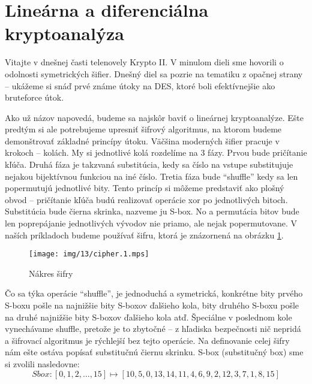 \section{Lineárna a diferenciálna kryptoanalýza}

Vitajte v dnešnej časti telenovely Krypto II. V minulom dieli sme
hovorili o odolnosti symetrických šifier. Dnešný diel sa pozrie na
tematiku z opačnej strany -- ukážeme si snáď prvé známe útoky na DES,
ktoré boli efektívnejšie ako bruteforce útok.

Ako už názov napovedá, budeme sa najskôr baviť o lineárnej
kryptoanalýze. Ešte predtým si ale potrebujeme upresniť šifrový
algoritmus, na ktorom budeme demonštrovať základné princípy útoku.
Väčšina moderných šifier pracuje v krokoch -- kolách.
My si jednotlivé kolá rozdelíme na 3 fázy. Prvou bude pričítanie
kľúča.
Druhá fáza je takzvaná substitúcia, kedy sa číslo na vstupe substitujuje
nejakou bijektívnou funkciou na iné číslo.
Tretia fáza bude ``shuffle'' kedy sa len popermutujú jednotlivé bity.
Tento princíp si môžeme predstaviť ako plošný obvod -- pričítanie
kľúča budú realizovať operácie xor po jednotlivých bitoch.
Substitúcia bude čierna skrinka, nazveme ju S-box. No a permutácia
bitov bude len poprepájanie jednotlivých vývodov nie priamo, ale nejak
popermutovane. V naších príkladoch budeme používať šifru, ktorá je
znázornená na obrázku \ref{fig:cipher}.

\begin{figure}[h]
    \centering
    \texttt{[image: img/13/cipher.1.mps]}
    \label{fig:cipher}
    \caption{Nákres šifry}
\end{figure}

Čo sa týka operácie ``shuffle'', je jednoduchá a symetrická, konkrétne
bity prvého S-boxu pošle na najnižšie bity S-boxov ďalšieho kola,
bity druhého S-boxu pošle na druhé najnižšie bity S-boxov ďalšieho
kola atď. Špeciálne v poslednom kole vynechávame shuffle, pretože je
to zbytočné -- z hľadiska bezpečnosti nič nepridá a šifrovací
algoritmus je rýchlejší bez tejto operácie. Na definovanie celej šifry
nám ešte ostáva popísať substitučnú čiernu skrinku.
S-box (substitučný box) sme si zvolili nasledovne:
\begin{equation*}
    Sbox:[0,1,2,\dots,15] \mapsto
    [10, 5, 0, 13, 14, 11, 4, 6, 9, 2, 12, 3, 7, 1, 8, 15]
\end{equation*}

